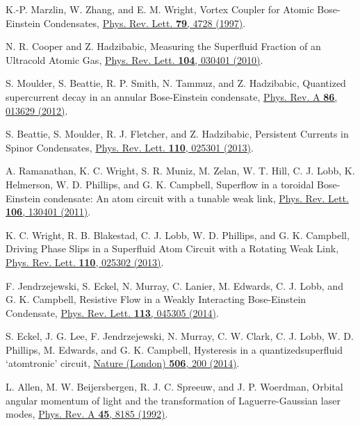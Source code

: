 \documentclass[twocolumn,prl,floatfix,citeautoscript,nofootinbib]{revtex4-1}
\begin{document}
\begin{thebibliography}{99}
 K.-P. Marzlin, W. Zhang, and E. M. Wright, {Vortex
Coupler for Atomic Bose-Einstein Condensates}, \href{http://dx.doi.org/10.1103/PhysRevLett.79.4728}%
{Phys. Rev. Lett. \textbf{79}, 4728 (1997)}.

 N. R. Cooper and Z. Hadzibabic, {Measuring the
Superfluid Fraction of an Ultracold Atomic Gas}, \href{http://dx.doi.org/10.1103/PhysRevLett.104.030401}%
{Phys. Rev. Lett. \textbf{104}, 030401 (2010)}.

 S. Moulder, S. Beattie, R. P. Smith, N. Tammuz, and Z.
Hadzibabic, {Quantized supercurrent decay in an annular Bose-Einstein
condensate}, \href{https://doi.org/10.1103/PhysRevA.86.013629}{Phys. Rev. A
\textbf{86}, 013629 (2012)}.

 S. Beattie, S. Moulder, R. J. Fletcher, and Z.
Hadzibabic, {Persistent Currents in Spinor Condensates}, \href{https://doi.org/10.1103/PhysRevLett.110.025301}%
{Phys. Rev. Lett. \textbf{110}, 025301 (2013)}.

 A. Ramanathan, K. C. Wright, S. R. Muniz, M. Zelan,
W. T. Hill, C. J. Lobb, K. Helmerson, W. D. Phillips, and G. K. Campbell, {%
Superflow in a toroidal Bose-Einstein condensate: An atom circuit with a
tunable weak link}, \href{https://doi.org/10.1103/PhysRevLett.110.025302}{%
Phys. Rev. Lett. \textbf{106}, 130401 (2011)}.

 K. C. Wright, R. B. Blakestad, C. J. Lobb, W. D.
Phillips, and G. K. Campbell, {Driving Phase Slips in a Superfluid Atom
Circuit with a Rotating Weak Link}, \href{https://doi.org/10.1103/PhysRevLett.110.025302}%
{Phys. Rev. Lett. \textbf{110}, 025302 (2013)}.

 F. Jendrzejewski, S. Eckel, N. Murray, C.
Lanier, M. Edwards, C. J. Lobb, and G. K. Campbell, {Resistive Flow in a
Weakly Interacting Bose-Einstein Condensate}, \href{https://doi.org/10.1103/PhysRevLett.113.045305}%
{Phys. Rev. Lett. \textbf{113}, 045305 (2014)}.

 S. Eckel, J. G. Lee, F. Jendrzejewski, N. Murray, C. W.
Clark, C. J. Lobb, W. D. Phillips, M. Edwards, and G. K. Campbell, {%
Hysteresis in a quantizedsuperfluid `atomtronic' circuit}, \href{http://dx.doi.org/10.1038/nature12958}%
{Nature (London) \textbf{506}, 200 (2014)}.



 L. Allen, M. W. Beijersbergen, R. J. C. Spreeuw, and J.
P. Woerdman, {Orbital angular momentum of light and the transformation of
Laguerre-Gaussian laser modes}, \href{http://doi.org/10.1103/PhysRevA.45.8185}%
{Phys. Rev. A \textbf{45}, 8185 (1992)}.


\end{thebibliography}
\end{document}
